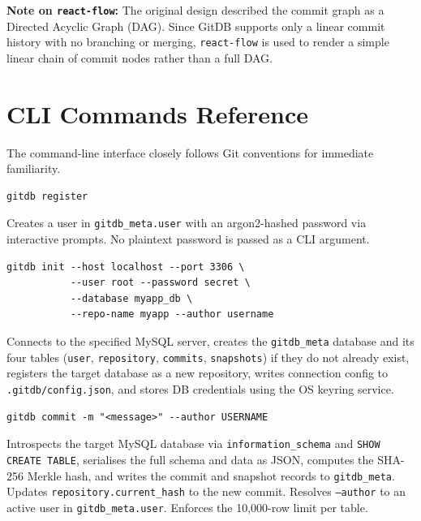 \documentclass[12pt, a4paper]{article}
\begin{document}
\begin{tcolorbox}[infobox]
\textbf{Note on \texttt{react-flow}:} The original design described the commit
graph as a Directed Acyclic Graph (DAG). Since GitDB supports only a linear
commit history with no branching or merging, \texttt{react-flow} is used to
render a simple linear chain of commit nodes rather than a full DAG.
\end{tcolorbox}

\section{CLI Commands Reference}

The command-line interface closely follows Git conventions for immediate
familiarity.

\begin{tcolorbox}[commandbox, title=\texttt{gitdb register}]
\begin{lstlisting}
gitdb register
\end{lstlisting}
\textcolor{codetext}{\small Creates a user in \texttt{gitdb\_meta.user}
with an argon2-hashed password via interactive prompts. No plaintext password
is passed as a CLI argument.}
\end{tcolorbox}

\begin{tcolorbox}[commandbox, title=\texttt{gitdb init}]
\begin{lstlisting}
gitdb init --host localhost --port 3306 \
           --user root --password secret \
           --database myapp_db \
           --repo-name myapp --author username
\end{lstlisting}
\textcolor{codetext}{\small Connects to the specified MySQL server, creates the
\texttt{gitdb\_meta} database and its four tables (\texttt{user},
\texttt{repository}, \texttt{commits}, \texttt{snapshots}) if they do not already
exist, registers the target database as a new repository, writes connection
config to \texttt{.gitdb/config.json}, and stores DB credentials using the
OS keyring service.}
\end{tcolorbox}

\begin{tcolorbox}[commandbox, title=\texttt{gitdb commit}]
\begin{lstlisting}
gitdb commit -m "<message>" --author USERNAME
\end{lstlisting}
\textcolor{codetext}{\small Introspects the target MySQL database via
\texttt{information\_schema} and \texttt{SHOW CREATE TABLE}, serialises the full
schema and data as JSON, computes the SHA-256 Merkle hash, and writes the commit
and snapshot records to \texttt{gitdb\_meta}. Updates \texttt{repository.current\_hash}
to the new commit. Resolves \texttt{--author} to an active user in
\texttt{gitdb\_meta.user}. Enforces the 10,000-row limit per table.}
\end{tcolorbox}
\end{document}
